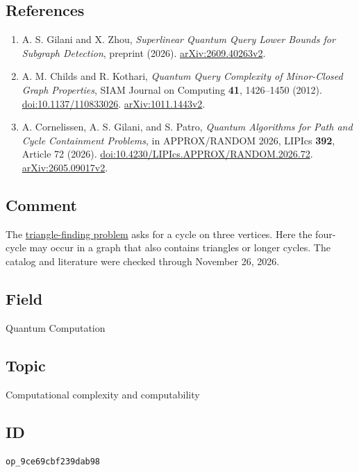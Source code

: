 \subsection*{References}

\begin{enumerate}[label={},leftmargin=4.8em,labelsep=0.5em]
  \footnotesize
  \item[\textup{[GZ26]}]\label{ref:fourcycle-gz}
  A. S. Gilani and X. Zhou, \emph{Superlinear Quantum Query Lower Bounds for Subgraph Detection}, preprint (2026). \href{https://arxiv.org/abs/2609.40263v2}{arXiv:2609.40263v2}.

  \item[\textup{[CK12]}]\label{ref:fourcycle-ck}
  A. M. Childs and R. Kothari, \emph{Quantum Query Complexity of Minor-Closed Graph Properties}, SIAM Journal on Computing \textbf{41}, 1426--1450 (2012). \href{https://doi.org/10.1137/110833026}{doi:10.1137/110833026}. \href{https://arxiv.org/abs/1011.1443v2}{arXiv:1011.1443v2}.

  \item[\textup{[CGP26]}]\label{ref:fourcycle-cgp}
  A. Cornelissen, A. S. Gilani, and S. Patro, \emph{Quantum Algorithms for Path and Cycle Containment Problems}, in APPROX/RANDOM 2026, LIPIcs \textbf{392}, Article 72 (2026). \href{https://doi.org/10.4230/LIPIcs.APPROX/RANDOM.2026.72}{doi:10.4230/LIPIcs.APPROX/RANDOM.2026.72}. \href{https://arxiv.org/abs/2605.09017v2}{arXiv:2605.09017v2}.
\end{enumerate}

\subsection*{Comment}

The \href{https://qiqc-op.com/problem/op_0c17d9fef967858d/}{triangle-finding problem} asks for a cycle on three vertices. Here the four-cycle may occur in a graph that also contains triangles or longer cycles. The catalog and literature were checked through November 26, 2026.

\subsection*{Field}

Quantum Computation

\subsection*{Topic}

Computational complexity and computability

\subsection*{ID}

\texttt{op\_9ce69cbf239dab98}
